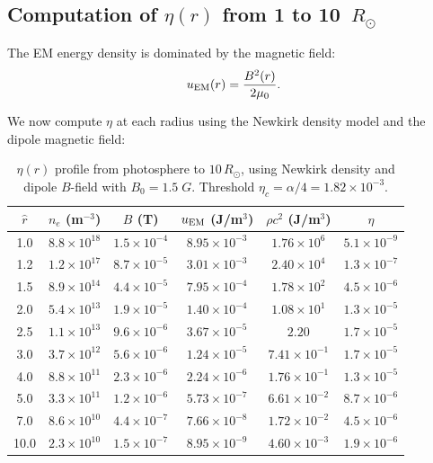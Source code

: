\documentclass[aps,prd,twocolumn,superscriptaddress,floatfix,nofootinbib]{revtex4-2}
\newcommand{\Rsun}{R_\odot}
\begin{document}
\subsection{Computation of $\eta(r)$ from 1 to 10~$\Rsun$}
\label{sec:eta-computation}

The EM energy density is dominated by the magnetic field:
\begin{equation}
u_{\rm EM}(r) = \frac{B^2(r)}{2\mu_0}.
\end{equation}

We now compute $\eta$ at each radius using the Newkirk density model
and the dipole magnetic field:

\begin{table}[h]
\caption{$\eta(r)$ profile from photosphere to $10\,\Rsun$,
using Newkirk density and dipole $B$-field with $B_0 = 1.5\;\si{G}$.
Threshold $\eta_c = \alpha/4 = 1.82\times10^{-3}$.}
\label{tab:eta-profile}
\begin{ruledtabular}
\begin{tabular}{cccccc}
$\hat{r}$ & $n_e$ (m$^{-3}$) & $B$ (T) &
$u_{\rm EM}$ (J/m$^3$) & $\rho c^2$ (J/m$^3$) & $\eta$ \\
\hline
1.0 & $8.8\times10^{18}$ & $1.5\times10^{-4}$ &
$8.95\times10^{-3}$ & $1.76\times10^{6}$ & $5.1\times10^{-9}$ \\
1.2 & $1.2\times10^{17}$ & $8.7\times10^{-5}$ &
$3.01\times10^{-3}$ & $2.40\times10^{4}$ & $1.3\times10^{-7}$ \\
1.5 & $8.9\times10^{14}$ & $4.4\times10^{-5}$ &
$7.95\times10^{-4}$ & $1.78\times10^{2}$ & $4.5\times10^{-6}$ \\
2.0 & $5.4\times10^{13}$ & $1.9\times10^{-5}$ &
$1.40\times10^{-4}$ & $1.08\times10^{1}$ & $1.3\times10^{-5}$ \\
2.5 & $1.1\times10^{13}$ & $9.6\times10^{-6}$ &
$3.67\times10^{-5}$ & $2.20$ & $1.7\times10^{-5}$ \\
3.0 & $3.7\times10^{12}$ & $5.6\times10^{-6}$ &
$1.24\times10^{-5}$ & $7.41\times10^{-1}$ & $1.7\times10^{-5}$ \\
4.0 & $8.8\times10^{11}$ & $2.3\times10^{-6}$ &
$2.24\times10^{-6}$ & $1.76\times10^{-1}$ & $1.3\times10^{-5}$ \\
5.0 & $3.3\times10^{11}$ & $1.2\times10^{-6}$ &
$5.73\times10^{-7}$ & $6.61\times10^{-2}$ & $8.7\times10^{-6}$ \\
7.0 & $8.6\times10^{10}$ & $4.4\times10^{-7}$ &
$7.66\times10^{-8}$ & $1.72\times10^{-2}$ & $4.5\times10^{-6}$ \\
10.0 & $2.3\times10^{10}$ & $1.5\times10^{-7}$ &
$8.95\times10^{-9}$ & $4.60\times10^{-3}$ & $1.9\times10^{-6}$ \\
\end{tabular}
\end{ruledtabular}
\end{table}
\end{document}
